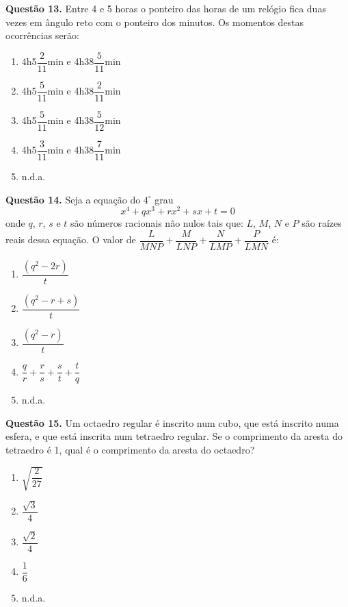 \documentclass[11pt]{article}
\begin{document}
\textbf{Questão 13.} Entre 4 e 5 horas o ponteiro das horas de um relógio fica  duas  vezes  em  ângulo  reto  com  o  ponteiro  dos  minutos. Os momentos destas ocorrências serão:

\begin{enumerate}[\bf A (\quad)]
    \item 4h5$\dfrac{2}{11}$min e 4h38$\dfrac{5}{11}$min
    \item 4h5$\dfrac{5}{11}$min e 4h38$\dfrac{2}{11}$min
    \item 4h5$\dfrac{5}{11}$min e 4h38$\dfrac{5}{12}$min
    \item 4h5$\dfrac{3}{11}$min e 4h38$\dfrac{7}{11}$min
    \item n.d.a.
\end{enumerate}


\textbf{Questão 14.} Seja a equação do $4^{\circ}$ grau 
$$
x^4 + qx^3 + rx^2 + sx + t = 0 
$$
onde $q$, $r$, $s$ e $t$ são números racionais não nulos tais que: $L$, $M$, $N$ e $P$ são raízes reais dessa equação. O valor de $\dfrac{L}{MNP} + \dfrac{M}{LNP} + \dfrac{N}{LMP} + \dfrac{P}{LMN}$ é:

\begin{multicols}{3}
    \begin{enumerate}[\bf A (\quad)]
        \item $\dfrac{(q^2 - 2r)}{t}$
        \item $\dfrac{(q^2 - r + s)}{t}$
        \item $\dfrac{(q^2 - r)}{t}$
        \item $\dfrac{q}{r} + \dfrac{r}{s} + \dfrac{s}{t} + \dfrac{t}{q}$
        \item n.d.a.
    \end{enumerate}
\end{multicols}

\textbf{Questão 15.} Um  octaedro  regular  é  inscrito  num  cubo,  que  está  inscrito  numa  esfera,  e  que  está  inscrita  num  tetraedro  regular. Se o comprimento da aresta do tetraedro é 1, qual é o comprimento da aresta do octaedro? 

\begin{multicols}{5}
    \begin{enumerate}[\bf A (\quad)]
        \item $\sqrt{\dfrac{2}{27}}$
        \item $\dfrac{\sqrt{3}}{4}$
        \item $\dfrac{\sqrt{2}}{4}$
        \item $\dfrac{1}{6}$
        \item n.d.a.
    \end{enumerate}
\end{multicols}
\end{document}
